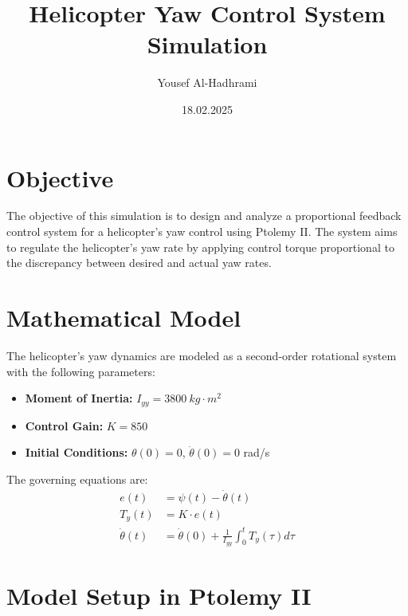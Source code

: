 \documentclass{article}
\title{Helicopter Yaw Control System Simulation}
\author{Yousef Al-Hadhrami}
\date{18.02.2025}
\begin{document}
\maketitle

\section{Objective}
The objective of this simulation is to design and analyze a proportional feedback control system for a helicopter's yaw control using Ptolemy II. The system aims to regulate the helicopter’s yaw rate by applying control torque proportional to the discrepancy between desired and actual yaw rates.

\section{Mathematical Model}
The helicopter's yaw dynamics are modeled as a second-order rotational system with the following parameters:
\begin{itemize}
    \item \textbf{Moment of Inertia:} $I_{yy} = 3800 \ kg \cdot m^2$
    \item \textbf{Control Gain:} $K = 850$
    \item \textbf{Initial Conditions:} $\theta(0) = 0$, $\dot{\theta}(0) = 0$ rad/s
\end{itemize}

The governing equations are:
\begin{align}
    e(t) &= \psi(t) - \dot{\theta}(t) \\
    T_y(t) &= K \cdot e(t) \\
    \dot{\theta}(t) &= \dot{\theta}(0) + \frac{1}{I_{yy}} \int_0^t T_y(\tau) d\tau
\end{align}

\section{Model Setup in Ptolemy II}
\end{document}
